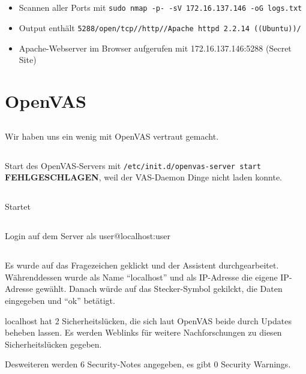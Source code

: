 \documentclass[twoside]{article}
\newcommand{\say}[1]{%
	``#1''%
}
\newcommand{\ttt}[1]{%
	\texttt{#1}%
}
\begin{document}
\subsection{}
\begin{itemize}
	\item Scannen aller Ports mit \ttt{sudo nmap -p- -sV 172.16.137.146 -oG logs.txt}
	\item Output enthält \ttt{5288/open/tcp//http//Apache httpd 2.2.14 ((Ubuntu))/}
	\item Apache-Webserver im Browser aufgerufen mit 172.16.137.146:5288 (Secret Site)
\end{itemize}


\section{OpenVAS}
\subsection{}
Wir haben uns ein wenig mit OpenVAS vertraut gemacht.
\subsection{}
Start des OpenVAS-Servers mit \ttt{/etc/init.d/openvas-server start}\\
\textbf{FEHLGESCHLAGEN}, weil der VAS-Daemon Dinge nicht laden konnte.
\subsection{}
Startet
\subsection{}
Login auf dem Server als user@localhost:user
\subsection{}
Es wurde auf das Fragezeichen geklickt und der Assistent durchgearbeitet.
Währenddessen wurde als Name \say{localhost} und als IP-Adresse die eigene IP-Adresse gewählt.
Danach würde auf das Stecker-Symbol gekilckt, die Daten eingegeben und \say{ok} betätigt.

localhost hat 2 Sicherheitslücken, die sich laut OpenVAS beide durch Updates beheben lassen.
Es werden Weblinks für weitere Nachforschungen zu diesen Sicherheitslücken gegeben.

Desweiteren werden 6 Security-Notes angegeben, es gibt 0 Security Warnings.
\end{document}

